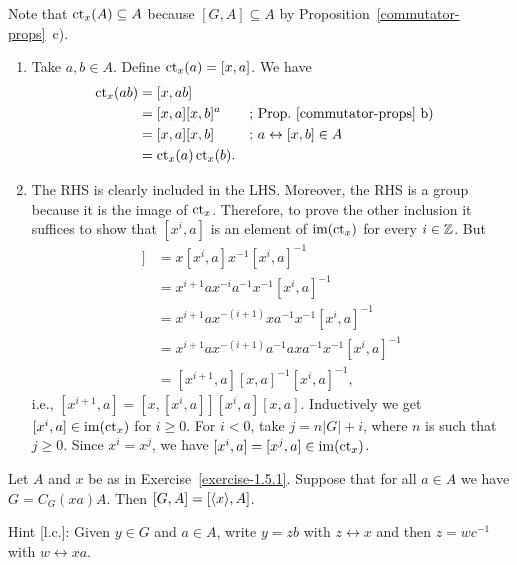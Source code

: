 \begin{solution} Note that $\operatorname{\operatorname{ct}}_x(A)\subseteq A$ because $[G,A]\subseteq A$ by Proposition~\ref{commutator-props}~c).

\begin{enumerate}[\rm a)]
    \item Take $a,b\in A$. Define $\operatorname{\operatorname{ct}}_x(a)=[x,a]$. We have
    \begin{align*}
        \operatorname{\operatorname{ct}}_x(ab) &= [x,ab]\\
            &= [x,a][x,b]^a &&\textrm{; Prop.~\ref{commutator-props}~b)}\\
            &= [x,a][x,b]   &&\textrm{; }a\leftrightarrow[x,b]\in A\\
            &= \operatorname{\operatorname{ct}}_x(a)\operatorname{\operatorname{ct}}_x(b).
    \end{align*}

    \item The RHS is clearly included in the LHS. Moreover, the RHS is a group because it is the image of $\operatorname{\operatorname{ct}}_x$. Therefore, to prove the other inclusion it suffices to show that $[x^i,a]$ is an element of $\operatorname{im}(\operatorname{\operatorname{ct}}_x)$ for every $i\in\mathbb{Z}$. But
    \begin{align*}
        [x,[x^i,a]] &= x[x^i,a]x^{-1}[x^i,a]^{-1}\\
            &= x^{i+1}ax^{-i}a^{-1}x^{-1}[x^i,a]^{-1}\\
            &= x^{i+1}ax^{-(i+1)}xa^{-1}x^{-1}[x^i,a]^{-1}\\
            &= x^{i+1}ax^{-(i+1)}a^{-1}axa^{-1}x^{-1}[x^i,a]^{-1}\\
            &= [x^{i+1},a][x,a]^{-1}[x^i,a]^{-1},
    \end{align*}
    i.e., $[x^{i+1},a]=[x,[x^i,a]][x^i,a][x,a]$. Inductively we get $[x^i,a]\in\operatorname{im}(\operatorname{\operatorname{ct}}_x)$ for $i\ge0$. For $i<0$, take $j=n|G|+i$, where $n$ is such that $j\ge0$. Since $x^i=x^j$, we have $[x^i,a]=[x^j,a]\in\operatorname{im}(\operatorname{\operatorname{ct}}_x)$.
\end{enumerate}
\end{solution}

\begin{exr}
    Let\/ $A$ and\/ $x$ be as in\/ \textrm{\rm Exercise~\ref{exercise-1.5.1}}. Suppose that for all\/ $a\in A$ we have $G = C_G(xa)A$. Then\/ $[G,A]=[\langle x\rangle,A]$.

    \textrm{\rm Hint [l.c.]: Given $y\in G$ and $a\in A$, write $y=zb$ with $z\leftrightarrow x$ and then $z=wc^{-1}$ with $w\leftrightarrow xa$.}
\end{exr}

